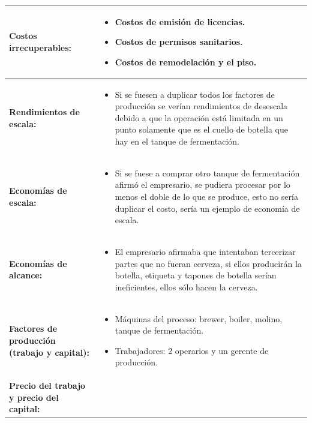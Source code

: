 \documentclass{article}
\begin{document}
\begin{center}
\begin{longtable}{ | p{4.5cm} | p{12cm} | }
        \hline
            \textbf{Costos irrecuperables: } & 
            \begin{itemize}
                \item Costos de emisión de licencias.
                \item Costos de permisos sanitarios.
                \item Costos de remodelación y el piso.
            \end{itemize} \\ 
        \hline
            \textbf{Rendimientos de escala: } & 
            \begin{itemize}
                \item Si se fuesen a duplicar todos los factores de producción se verían rendimientos de desescala debido a que la operación está limitada en un punto solamente que es el cuello de botella que hay en el tanque de fermentación.
            \end{itemize} \\ 
        \hline
            \textbf{Economías de escala: } & 
            \begin{itemize}
                \item Si se fuese a comprar otro tanque de fermentación afirmó el empresario, se pudiera procesar por lo menos el doble de lo que se produce, esto no sería duplicar el costo, sería un ejemplo de economía de escala.
            \end{itemize} \\ 
        \hline
            \textbf{Economías de alcance: } & 
            \begin{itemize}
                \item El empresario afirmaba que intentaban tercerizar partes que no fueran cerveza, si ellos producirán la botella, etiqueta y tapones de botella serían ineficientes, ellos sólo hacen la cerveza. 
            \end{itemize} \\ 
        \hline
            \textbf{Factores de producción (trabajo y capital): } & 
            \begin{itemize}
                \item Máquinas del proceso: brewer, boiler, molino, tanque de fermentación.
                \item Trabajadores: 2 operarios y un gerente de producción.
            \end{itemize} \\ 
        \hline
            \textbf{Precio del trabajo y precio del capital: } & 

\end{longtable}
\end{center}
\end{document}
